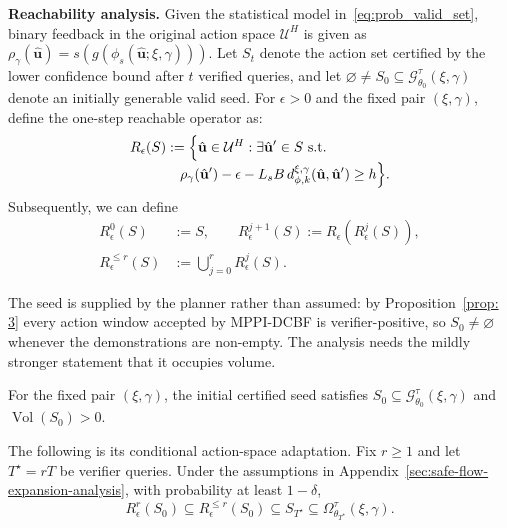 \begin{itemize}[leftmargin=0pt, itemindent=0pt, label={}]
\noindent\textbf{Reachability analysis.}
Given the statistical model in~\eqref{eq:prob_valid_set}, binary feedback in the original action space $\mathcal U^H$ is given as \( \rho_\gamma(\hat{\mathbf u})=s\!\left(g(\phi_s(\hat{\mathbf u};\xi,\gamma))\right)\).
Let \(S_t\) denote the action set certified by the lower confidence
bound after \(t\) verified queries, and let
\(\varnothing\neq S_0\subseteq
\mathcal G_{\theta_0}^{\tau}(\xi,\gamma)\) denote an initially
generable valid seed. For \(\epsilon>0\) and the fixed pair
\((\xi,\gamma)\), define the one-step reachable operator as:
\begin{equation}
\begin{aligned}
R_\epsilon(S)
&:=
\Bigl\{
\hat{\mathbf u}\in\mathcal U^H:
\exists\hat{\mathbf u}'\in S\ \text{s.t.}\\[-1mm]
&\quad
\rho_\gamma(\hat{\mathbf u}')-\epsilon
-L_sB\,d_{\phi,k}^{\xi,\gamma}
(\hat{\mathbf u},\hat{\mathbf u}')\ge h
\Bigr\}.
\end{aligned}
\label{eq:reachable-action-set}
\end{equation}
Subsequently, we can define
\begin{equation}
\begin{aligned}
R_\epsilon^0(S)&:=S,\qquad
R_\epsilon^{j+1}(S):=R_\epsilon(R_\epsilon^j(S)),\\
R_\epsilon^{\le r}(S)&:=
\bigcup_{j=0}^{r}R_\epsilon^j(S).
\end{aligned}
\label{eq:cumulative-reachable-action-set}
\end{equation}

{\color{blue}
The seed is supplied by the planner rather than assumed: by Proposition~\ref{prop: 3} every action window accepted by MPPI-DCBF is verifier-positive, so $S_0\neq\varnothing$ whenever the demonstrations are non-empty. The analysis needs the mildly stronger statement that it occupies volume.
\begin{assumption}
\label{ass:positive-volume-seed}
For the fixed pair $(\xi,\gamma)$, the initial certified seed satisfies
$S_0\subseteq\mathcal G_{\theta_0}^{\tau}(\xi,\gamma)$ and
$\operatorname{Vol}(S_0)>0$.
\end{assumption}
}

\begin{lemma}
\label{lem:reachable-generable-coverage}
The following is its conditional action-space adaptation. Fix \(r\ge1\)
and let \(T^\star=rT\) be verifier queries. Under the
assumptions in Appendix~\ref{sec:safe-flow-expansion-analysis}, with probability at least \(1-\delta\),
\begin{equation}
R_\epsilon^r(S_0)
\subseteq
R_\epsilon^{\le r}(S_0)
\subseteq
S_{T^\star}
\subseteq
\Omega_{\theta_{T^\star}}^\tau(\xi,\gamma).
\label{eq:main_inclusion}
\end{equation}
\end{lemma}


\end{itemize}
